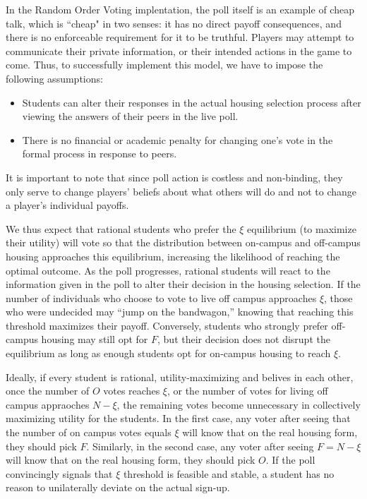 \documentclass[12pt]{article}
\begin{document}
In the Random Order Voting implentation, the poll itself is an example of cheap talk, which is “cheap" in two senses: it has no direct payoff consequences, and there is no enforceable requirement for it to be truthful. Players may attempt to communicate their private information, or their intended actions in the game to come. Thus, to successfully implement this model, we have to impose the following assumptions:
\begin{itemize}
    \item Students can alter their responses in the actual housing selection process after viewing the answers of their peers in the live poll.
    \item There is no financial or academic penalty for changing one’s vote in the formal process in response to peers.
\end{itemize}
It is important to note that since poll action is costless and non‐binding, they only serve to change players’ beliefs about what others will do and not to change a player’s individual payoffs.


We thus expect that rational students who prefer the $\xi$ equilibrium (to maximize their utility) will vote so that the distribution between on-campus and off-campus housing approaches this equilibrium, increasing the likelihood of reaching the optimal outcome. As the poll progresses, rational students will react to the information given in the poll to alter their decision in the housing selection. If the number of individuals who choose to vote to live off campus approaches $\xi$, those who were undecided may “jump on the bandwagon,” knowing that reaching this threshold maximizes their payoff. Conversely, students who strongly prefer off-campus housing may still opt for $F$, but their decision does not disrupt the equilibrium as long as enough students opt for on-campus housing to reach $\xi$. 


Ideally, if every student is rational, utility-maximizing and belives in each other, once the number of $O$ votes reaches $\xi$, or the number of votes for living off campus appraoches $N-\xi$, the remaining votes become unnecessary in collectively maximizing utility for the students. In the first case, any voter after seeing that the number of on campus votes equals $\xi$ will know that on the real housing form, they should pick $F$. Similarly, in the second case, any voter after seeing $F=N-\xi$ will know that on the real housing form, they should pick $O$. If the poll convincingly signals that $\xi$ threshold is feasible and stable, a student has no reason to unilaterally deviate on the actual sign‐up. 
\end{document}
